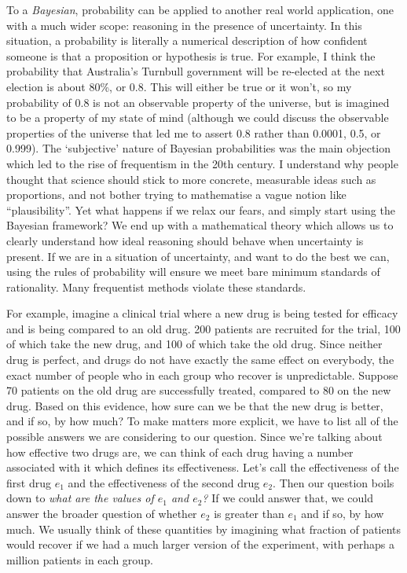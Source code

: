 \documentclass[a4paper, 12pt]{article}
\begin{document}
To a {\em Bayesian}, probability can be applied to another real world
application, one with a much wider scope: reasoning in the presence of
uncertainty. In this situation, a probability is literally a numerical
description of how confident someone is that a proposition or hypothesis is
true. For example,
I think the probability that Australia's Turnbull government will be
re-elected at the next election is about 80\%, or 0.8. This will either be true
or it won't, so my probability of 0.8 is not an observable property of
the universe, but is imagined to be a property of my state of mind
(although we could
discuss the observable properties of the universe that led me to assert 0.8
rather than 0.0001, 0.5, or 0.999). The `subjective' nature of Bayesian
probabilities was the main objection which led to the rise of frequentism in
the 20th century. I understand why people thought that science should stick
to more concrete, measurable ideas such as proportions, and not bother trying
to mathematise a vague notion like ``plausibility''.
Yet what happens if we relax our fears, and simply start using the Bayesian
framework? We end up with a mathematical theory which allows us to clearly
understand how ideal reasoning should behave when uncertainty is present. If we
are in a situation of uncertainty, and want to do the best we can, using the
rules of probability will ensure we meet bare minimum standards of rationality.
Many frequentist methods violate these standards.

For example, imagine a clinical trial where a new drug is being tested for
efficacy and is being compared to an old drug.
200 patients are recruited for the trial, 100
of which take the new drug, and 100 of which take the old drug. Since neither
drug is perfect, and drugs do not have exactly the same effect on everybody,
the exact number of people who in each group who recover is unpredictable.
Suppose 70 patients on the old drug are successfully treated, compared to
80 on the new drug. Based on this evidence, how sure can we be that the new
drug is better, and if so, by how much?
To make matters more explicit, we have to list all of the possible answers
we are considering to our question. Since we're talking about how effective
two drugs are, we can think of each drug having a number associated with it
which defines its effectiveness. Let's call the effectiveness of the first drug
$e_1$ and the effectiveness of the second drug $e_2$. Then our question boils
down to {\em what are the values of $e_1$ and $e_2$?} If we could answer that,
we could answer the broader question of whether $e_2$ is greater than $e_1$ and
if so, by how much. We usually think of these quantities by imagining what
fraction of patients would recover if we had a much larger version of the
experiment, with perhaps a million patients in each group.
\end{document}
